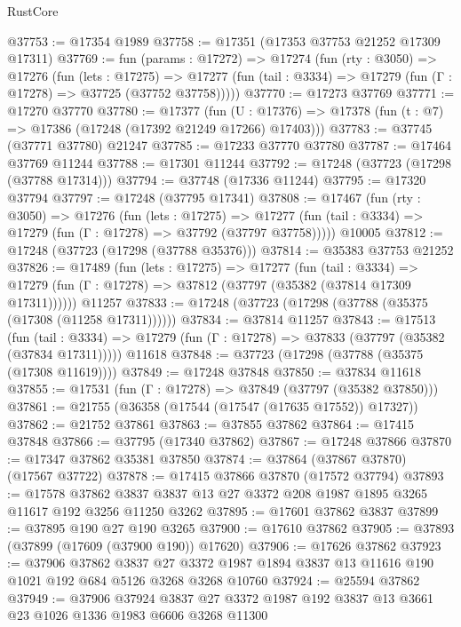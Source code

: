 \begin{lexlean}{RustCore}
\begin{coremodule}
@37753 := @17354 @1989
@37758 := @17351 (@17353 @37753 @21252 @17309 @17311)
@37769 := fun (params : @17272) =>
  @17274
    (fun (rty : @3050) =>
    @17276
      (fun (lets : @17275) =>
      @17277 (fun (tail : @3334) => @17279 (fun (Γ : @17278) => @37725 (@37752 @37758)))))
@37770 := @17273 @37769
@37771 := @17270 @37770
@37780 := @17377
    (fun (U : @17376) => @17378 (fun (t : @7) => @17386 (@17248 (@17392 @21249 @17266) @17403)))
@37783 := @37745 (@37771 @37780) @21247
@37785 := @17233 @37770 @37780
@37787 := @17464 @37769 @11244
@37788 := @17301 @11244
@37792 := @17248 (@37723 (@17298 (@37788 @17314)))
@37794 := @37748 (@17336 @11244)
@37795 := @17320 @37794
@37797 := @17248 (@37795 @17341)
@37808 := @17467
    (fun (rty : @3050) =>
    @17276
      (fun (lets : @17275) =>
      @17277 (fun (tail : @3334) => @17279 (fun (Γ : @17278) => @37792 (@37797 @37758)))))
    @10005
@37812 := @17248 (@37723 (@17298 (@37788 @35376)))
@37814 := @35383 @37753 @21252
@37826 := @17489
    (fun (lets : @17275) =>
    @17277
      (fun (tail : @3334) =>
      @17279 (fun (Γ : @17278) => @37812 (@37797 (@35382 (@37814 @17309 @17311))))))
    @11257
@37833 := @17248 (@37723 (@17298 (@37788 (@35375 (@17308 (@11258 @17311))))))
@37834 := @37814 @11257
@37843 := @17513
    (fun (tail : @3334) => @17279 (fun (Γ : @17278) => @37833 (@37797 (@35382 (@37834 @17311)))))
    @11618
@37848 := @37723 (@17298 (@37788 (@35375 (@17308 @11619))))
@37849 := @17248 @37848
@37850 := @37834 @11618
@37855 := @17531 (fun (Γ : @17278) => @37849 (@37797 (@35382 @37850)))
@37861 := @21755 (@36358 (@17544 (@17547 (@17635 @17552)) @17327))
@37862 := @21752 @37861
@37863 := @37855 @37862
@37864 := @17415 @37848
@37866 := @37795 (@17340 @37862)
@37867 := @17248 @37866
@37870 := @17347 @37862 @35381 @37850
@37874 := @37864 (@37867 @37870) (@17567 @37722)
@37878 := @17415 @37866 @37870 (@17572 @37794)
@37893 := @17578
    @37862
    @3837
    @3837
    @13
    @27
    @3372
    @208
    @1987
    @1895
    @3265
    @11617
    @192
    @3256
    @11250
    @3262
@37895 := @17601 @37862 @3837
@37899 := @37895 @190 @27 @190 @3265
@37900 := @17610 @37862
@37905 := @37893 (@37899 (@17609 (@37900 @190)) @17620)
@37906 := @17626 @37862
@37923 := @37906
    @37862
    @3837
    @27
    @3372
    @1987
    @1894
    @3837
    @13
    @11616
    @190
    @1021
    @192
    @684
    @5126
    @3268
    @3268
    @10760
@37924 := @25594 @37862
@37949 := @37906
    @37924
    @3837
    @27
    @3372
    @1987
    @192
    @3837
    @13
    @3661
    @23
    @1026
    @1336
    @1983
    @6606
    @3268
    @11300

\end{coremodule}
\end{lexlean}
